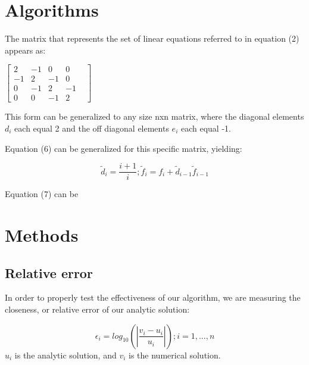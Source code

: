 \documentclass[10pt,showpacs,preprintnumbers,footinbib,amsmath,amssymb,aps,prl,twocolumn,groupedaddress,superscriptaddress,showkeys]{revtex4-1}
\begin{document}
\section{Algorithms}	

The matrix that represents the set of linear equations referred to in equation (2) appears as:
\begin{center}
		$\begin{bmatrix}
			2 & -1 & 0 & 0 \\
			-1 & 2 & -1 & 0 & \\
			0 & -1 & 2 & -1   \\
			0 & 0 & -1 & 2 
		\end{bmatrix}$
		 
		\end{center}
This form can be generalized to any size nxn matrix, where the diagonal elements $d_{i}$ each equal 2 and the off diagonal elements $e_{i}$ each equal -1.

Equation (6) can be generalized for this specific matrix, yielding: 


	\begin{equation}
	\tilde{d}_{i}=\frac{i+1}{i};  
	\tilde{f}_{i}=f_{i}+{\tilde{d}_{i-1}}\tilde{f}_{i-1}
	\end{equation}


Equation (7) can be 

\section{Methods}
	\subsection{Relative error}

In order to properly test the effectiveness of our algorithm, we are measuring the closeness, or relative error of our analytic solution:

	\begin{equation}
	\epsilon_{i} = log_{10}(|\frac{v_{i}-u_{i}}{u_{i}}|)  ; i = 1,...,n
	\label{error}
	\end{equation}
$u_{i}$ is the analytic solution, and $v_{i}$ is the numerical solution.
\end{document}
